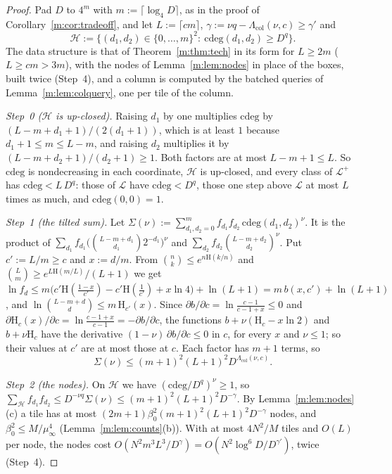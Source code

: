 \documentclass[11pt]{article}
\theoremstyle{definition}
\theoremstyle{remark}
\newcommand{\Hh}{\mathrm{H}}
\begin{document}
\begin{proof}
Pad $D$ to $4^m$ with $m:=\lceil\log_4D\rceil$, as in the proof of Corollary~\ref{m:cor:tradeoff}, and let $L:=\lceil cm\rceil$, $\gamma:=\nu q-\Lambda_{\mathrm{col}}(\nu,c)\ge\gamma'$ and
\[
\mathcal H:=\{(d_1,d_2)\in\{0,\dots,m\}^2:\ \mathrm{cdeg}(d_1,d_2)\ge D^q\}.
\]
The data structure is that of Theorem~\ref{m:thm:tech} in its form for $L\ge2m$ ($L\ge cm>3m$), with the nodes of Lemma~\ref{m:lem:nodes} in place of the boxes, built twice (Step~4), and a column is computed by the batched queries of Lemma~\ref{m:lem:colquery}, one per tile of the column.

\emph{Step~0 ($\mathcal H$ is up-closed).} Raising $d_1$ by one multiplies $\mathrm{cdeg}$ by $(L-m+d_1+1)/(2(d_1+1))$, which is at least $1$ because $d_1+1\le m\le L-m$, and raising $d_2$ multiplies it by $(L-m+d_2+1)/(d_2+1)\ge1$. Both factors are at most $L-m+1\le L$. So $\mathrm{cdeg}$ is nondecreasing in each coordinate, $\mathcal H$ is up-closed, and every class of $\mathcal L^+$ has $\mathrm{cdeg}<L\,D^q$: those of $\mathcal L$ have $\mathrm{cdeg}<D^q$, those one step above $\mathcal L$ at most $L$ times as much, and $\mathrm{cdeg}(0,0)=1$.

\emph{Step~1 (the tilted sum).} Let $\Sigma(\nu):=\sum_{d_1,d_2=0}^mf_{d_1}f_{d_2}\,\mathrm{cdeg}(d_1,d_2)^\nu$. It is the product of $\sum_{d_1}f_{d_1}\big(\binom{L-m+d_1}{d_1}2^{-d_1}\big)^\nu$ and $\sum_{d_2}f_{d_2}\binom{L-m+d_2}{d_2}^\nu$. Put $c':=L/m\ge c$ and $x:=d/m$. From $\binom nk\le e^{n\Hh(k/n)}$ and $\binom Lm\ge e^{L\Hh(m/L)}/(L+1)$ we get $\ln f_d\le m\big(c'\Hh(\frac{1-x}{c'})-c'\Hh(\frac1{c'})+x\ln4\big)+\ln(L+1)=m\,b(x,c')+\ln(L+1)$, and $\ln\binom{L-m+d}d\le m\,\Hh_{c'}(x)$. Since $\partial b/\partial c=\ln\frac{c-1}{c-1+x}\le0$ and $\partial\Hh_c(x)/\partial c=\ln\frac{c-1+x}{c-1}=-\partial b/\partial c$, the functions $b+\nu(\Hh_c-x\ln2)$ and $b+\nu\Hh_c$ have the derivative $(1-\nu)\,\partial b/\partial c\le0$ in $c$, for every $x$ and $\nu\le1$; so their values at $c'$ are at most those at $c$. Each factor has $m+1$ terms, so
\[
\Sigma(\nu)\le(m+1)^2(L+1)^2D^{\Lambda_{\mathrm{col}}(\nu,c)}.
\]

\emph{Step~2 (the nodes).} On $\mathcal H$ we have $(\mathrm{cdeg}/D^q)^\nu\ge1$, so $\sum_{\mathcal H}f_{d_1}f_{d_2}\le D^{-\nu q}\Sigma(\nu)\le(m+1)^2(L+1)^2D^{-\gamma}$. By Lemma~\ref{m:lem:nodes}(c) a tile has at most $(2m+1)\beta_0^2(m+1)^2(L+1)^2D^{-\gamma}$ nodes, and $\beta_0^2\le M/\mu_\infty^4$ (Lemma~\ref{m:lem:counts}(b)). With at most $4N^2/M$ tiles and $O(L)$ per node, the nodes cost $O(N^2m^3L^3/D^\gamma)=O(N^2\log^6\!D/D^{\gamma'})$, twice (Step~4).


\end{proof}
\end{document}
